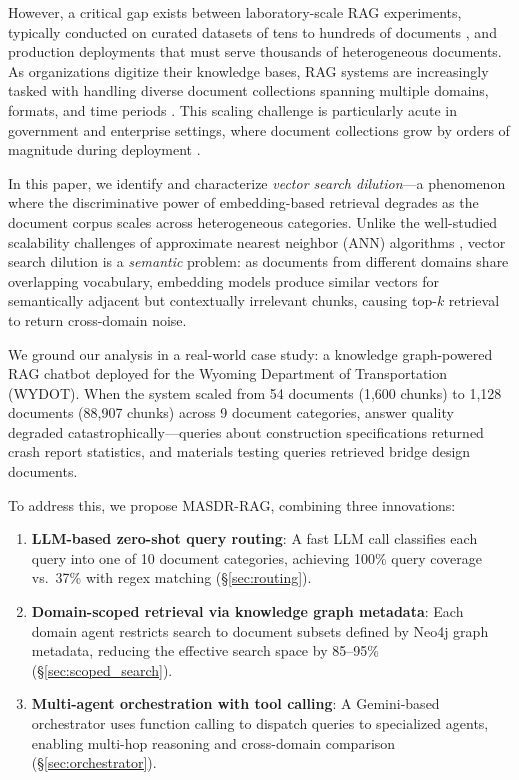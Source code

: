 \documentclass[11pt,a4paper]{article}
\newcommand{\systemname}{\textsc{MASDR-RAG}}
\newcommand{\numDocs}{1{,}128}
\newcommand{\numChunks}{88{,}907}
\begin{document}
However, a critical gap exists between laboratory-scale RAG experiments, typically conducted on curated datasets of tens to hundreds of documents \cite{kwiatkowski2019naturalquestions, joshi2017triviaqa}, and production deployments that must serve thousands of heterogeneous documents. As organizations digitize their knowledge bases, RAG systems are increasingly tasked with handling diverse document collections spanning multiple domains, formats, and time periods \cite{barnett2024observations}. This scaling challenge is particularly acute in government and enterprise settings, where document collections grow by orders of magnitude during deployment \cite{rag4cm2025}.

In this paper, we identify and characterize \textit{vector search dilution}---a phenomenon where the discriminative power of embedding-based retrieval degrades as the document corpus scales across heterogeneous categories. Unlike the well-studied scalability challenges of approximate nearest neighbor (ANN) algorithms \cite{malkov2020hnsw, johnson2021faiss}, vector search dilution is a \textit{semantic} problem: as documents from different domains share overlapping vocabulary, embedding models produce similar vectors for semantically adjacent but contextually irrelevant chunks, causing top-$k$ retrieval to return cross-domain noise.

We ground our analysis in a real-world case study: a knowledge graph-powered RAG chatbot deployed for the Wyoming Department of Transportation (WYDOT). When the system scaled from 54 documents (1,600 chunks) to \numDocs{} documents (\numChunks{} chunks) across 9 document categories, answer quality degraded catastrophically---queries about construction specifications returned crash report statistics, and materials testing queries retrieved bridge design documents.

To address this, we propose \systemname{}, combining three innovations:

\begin{enumerate}[leftmargin=*,topsep=2pt,itemsep=1pt]
    \item \textbf{LLM-based zero-shot query routing}: A fast LLM call classifies each query into one of 10 document categories, achieving 100\% query coverage vs.\ 37\% with regex matching (\S\ref{sec:routing}).
    \item \textbf{Domain-scoped retrieval via knowledge graph metadata}: Each domain agent restricts search to document subsets defined by Neo4j graph metadata, reducing the effective search space by 85--95\% (\S\ref{sec:scoped_search}).
    \item \textbf{Multi-agent orchestration with tool calling}: A Gemini-based orchestrator uses function calling to dispatch queries to specialized agents, enabling multi-hop reasoning and cross-domain comparison (\S\ref{sec:orchestrator}).
\end{enumerate}
\end{document}
